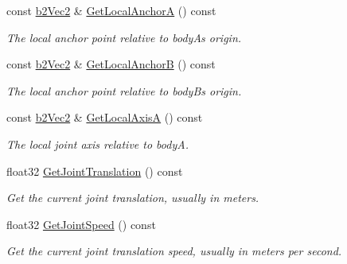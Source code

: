 \begin{DoxyCompactItemize}
const \hyperlink{structb2Vec2}{b2\+Vec2} \& \hyperlink{classb2WheelJoint_aaf132c39227962a0b0788558e7dd6662}{Get\+Local\+AnchorA} () const
\begin{DoxyCompactList}\small\item\em The local anchor point relative to bodyA\textquotesingle{}s origin. \end{DoxyCompactList}\item 
\mbox{\label{classb2WheelJoint_a78c56833f42bfc61998aa5ea8c876f3e}} 
const \hyperlink{structb2Vec2}{b2\+Vec2} \& \hyperlink{classb2WheelJoint_a78c56833f42bfc61998aa5ea8c876f3e}{Get\+Local\+AnchorB} () const
\begin{DoxyCompactList}\small\item\em The local anchor point relative to bodyB\textquotesingle{}s origin. \end{DoxyCompactList}\item 
\mbox{\label{classb2WheelJoint_a86bf4dbf356f9095c05d62313810e602}} 
const \hyperlink{structb2Vec2}{b2\+Vec2} \& \hyperlink{classb2WheelJoint_a86bf4dbf356f9095c05d62313810e602}{Get\+Local\+AxisA} () const
\begin{DoxyCompactList}\small\item\em The local joint axis relative to bodyA. \end{DoxyCompactList}\item 
\mbox{\label{classb2WheelJoint_a4cebb70f659344d5d93c1885d47000e3}} 
float32 \hyperlink{classb2WheelJoint_a4cebb70f659344d5d93c1885d47000e3}{Get\+Joint\+Translation} () const
\begin{DoxyCompactList}\small\item\em Get the current joint translation, usually in meters. \end{DoxyCompactList}\item 
\mbox{\label{classb2WheelJoint_a5503d957093b7abdcaa56916651ebdab}} 
float32 \hyperlink{classb2WheelJoint_a5503d957093b7abdcaa56916651ebdab}{Get\+Joint\+Speed} () const
\begin{DoxyCompactList}\small\item\em Get the current joint translation speed, usually in meters per second. \end{DoxyCompactList}\item 
\mbox{\label{classb2WheelJoint_aef7948a18ec2784397a1d3745824cd78}} 

\end{DoxyCompactItemize}
